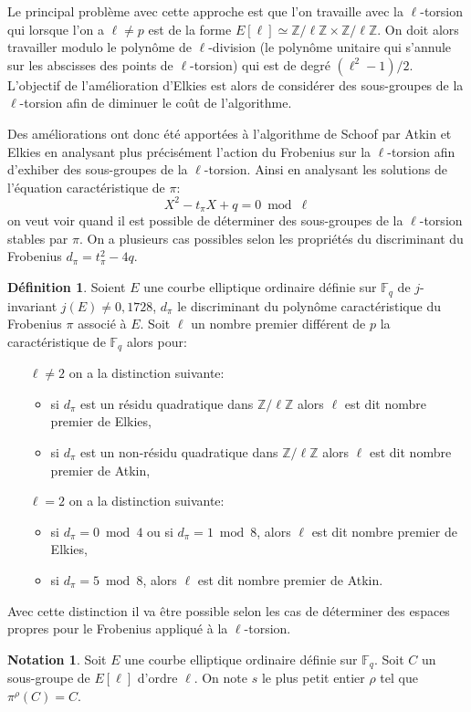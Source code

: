 \documentclass[10pt,a4paper]{book}
\theoremstyle{plain}
\theoremstyle{definition}
\theoremstyle{definition}
\theoremstyle{definition}
\theoremstyle{definition}
\theoremstyle{definition}
\newtheorem{defi}[thm]{Définition}
\theoremstyle{remark}
\theoremstyle{remark}
\theoremstyle{definition}
\newtheorem{nota}[thm]{Notation}
\begin{document}
Le principal problème avec cette approche est que l'on travaille avec la $\ell$-torsion qui lorsque l'on a $\ell \neq p$ est de la forme $E[\ell] \simeq \mathbb{Z}/\ell \mathbb{Z} \times \mathbb{Z}/\ell \mathbb{Z}$. On doit alors travailler modulo le polynôme de $\ell$-division (le polynôme unitaire qui s'annule sur les abscisses des points de $\ell$-torsion) qui est de degré $(\ell^2-1)/2$. L'objectif de l'amélioration d'Elkies est alors de considérer des sous-groupes de la $\ell$-torsion afin de diminuer le coût de l'algorithme.

Des améliorations ont donc été apportées à l'algorithme de Schoof par Atkin et Elkies en analysant plus précisément l'action du Frobenius sur la $\ell$-torsion afin d'exhiber des sous-groupes de la $\ell$-torsion. Ainsi en analysant les solutions de l'équation caractéristique de $\pi$:
\begin{equation*}
X^2-t_{\pi}X+q = 0 \bmod \ell
\end{equation*} 
on veut voir quand il est possible de déterminer des sous-groupes de la 
$\ell$-torsion stables par $\pi$.
On a plusieurs cas possibles selon les propriétés du discriminant du Frobenius 
$d_{\pi}=t_{\pi}^2-4q$.

\begin{defi}\label{def:dif-Atk-Elk}
Soient $E$ une courbe elliptique ordinaire définie sur $\mathbb{F}_q$ de $j$-invariant $j(E) \neq 0,1728$, $d_{\pi}$ le discriminant du polynôme caractéristique du Frobenius $\pi$ associé à $E$. Soit $\ell$ un nombre premier différent de $p$ la caractéristique de $\mathbb{F}_q$ alors pour:
\begin{itemize}
\item[$\ell \neq 2$] on a la distinction suivante: 

\begin{itemize}
\item si $d_{\pi}$ est un résidu quadratique dans $\mathbb{Z}/\ell \mathbb{Z}$ alors $\ell$ est dit nombre premier de Elkies,
\item si $d_{\pi}$ est un non-résidu quadratique dans $\mathbb{Z}/\ell \mathbb{Z}$ alors $\ell$ est dit nombre premier de Atkin,
\end{itemize} 

\item[$\ell=2$] on a la distinction suivante:
\begin{itemize}
\item si $d_{\pi}= 0 \bmod 4$ ou si $d_{\pi}= 1 \bmod 8$, alors $\ell$ est dit nombre premier de Elkies,
\item si $d_{\pi}= 5 \bmod 8$, alors $\ell$ est dit nombre premier de Atkin.
\end{itemize}
\end{itemize}
\end{defi}
	Avec cette distinction il va être possible selon les cas de déterminer des espaces propres pour le Frobenius appliqué à la $\ell$-torsion.
\begin{nota}
Soit $E$ une courbe elliptique ordinaire définie sur $\mathbb{F}_q$. Soit $C$ un sous-groupe de $E[\ell]$ d'ordre $\ell$. On note $s$ le plus petit entier $\rho$ tel que $\pi^{\rho}(C)=C$.
\end{nota}	
	 
\end{document}
